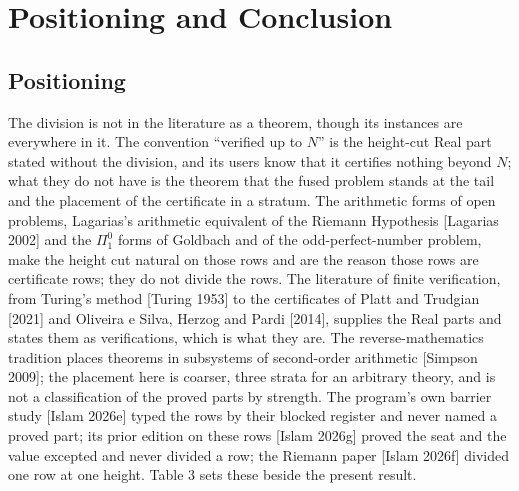 \documentclass[10pt]{article}
\begin{document}
\hypertarget{positioning-and-conclusion}{%
\section{Positioning and Conclusion}\label{positioning-and-conclusion}}

\hypertarget{positioning}{%
\subsection{Positioning}\label{positioning}}

The division is not in the literature as a theorem, though its instances
are everywhere in it. The convention ``verified up to \(N\)'' is the
height-cut Real part stated without the division, and its users know
that it certifies nothing beyond \(N\); what they do not have is the
theorem that the fused problem stands at the tail and the placement of
the certificate in a stratum. The arithmetic forms of open problems,
Lagarias's arithmetic equivalent of the Riemann Hypothesis {[}Lagarias
2002{]} and the \(\Pi^0_1\) forms of Goldbach and of the
odd-perfect-number problem, make the height cut natural on those rows
and are the reason those rows are certificate rows; they do not divide
the rows. The literature of finite verification, from Turing's method
{[}Turing 1953{]} to the certificates of Platt and Trudgian {[}2021{]}
and Oliveira e Silva, Herzog and Pardi {[}2014{]}, supplies the Real
parts and states them as verifications, which is what they are. The
reverse-mathematics tradition places theorems in subsystems of
second-order arithmetic {[}Simpson 2009{]}; the placement here is
coarser, three strata for an arbitrary theory, and is not a
classification of the proved parts by strength. The program's own
barrier study {[}Islam 2026e{]} typed the rows by their blocked register
and never named a proved part; its prior edition on these rows {[}Islam
2026g{]} proved the seat and the value excepted and never divided a row;
the Riemann paper {[}Islam 2026f{]} divided one row at one height. Table
3 sets these beside the present result.
\end{document}
